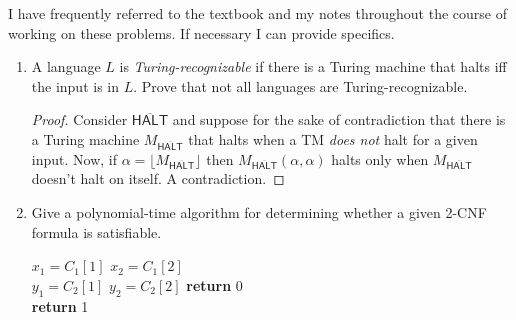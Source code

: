 \documentclass[usletter]{article}
\newcommand{\halt}[0]{
  \overline{\textsf{HALT}}
}
\begin{document}

I have frequently referred to the textbook \cite{textbook} and my notes throughout the course of working on these problems. If necessary I can provide specifics.

\begin{enumerate}
  \item A language $L$ is \textit{Turing-recognizable} if there is a Turing machine that halts iff the input is in $L$. Prove that not all languages are Turing-recognizable.
    \begin{proof}
      Consider $\halt$ and suppose for the sake of contradiction that there is a Turing machine $M_{\halt}$ that halts when a TM \textit{does not} halt for a given input. Now, if $\alpha = \lfloor M_{\halt} \rfloor $ then $M_{\halt}(\alpha, \alpha)$ halts only when $M_{\halt}$ doesn't halt on itself. A contradiction.
    \end{proof}

  \item Give a polynomial-time algorithm for determining whether a given 2-CNF formula is satisfiable.

    \begin{algorithm}
      \begin{algorithmic}[1]
        \State $x_1 = C_1[1]$
        \State $x_2 = C_1[2]$ \\
        \State $y_1 = C_2[1]$
        \State $y_2 = C_2[2]$
        \State \textbf{return} 0
        \EndIf
        \EndFor
        \EndFor \\
        \State \textbf{return} 1
        \EndProcedure
      \end{algorithmic}
    \end{algorithm}

\end{enumerate}

\newpage



\end{document}
